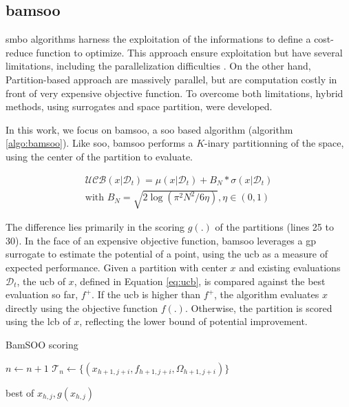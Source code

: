 \subsection{\acrfull{bamsoo}}
\label{sec:bamsoo}

\acrfull{smbo} algorithms harness the exploitation of the informations to define a cost-reduce function to optimize. This approach ensure exploitation but have several limitations, including the parallelization difficulties \cite{X,X}. On the other hand, Partition-based approach are massively parallel, but are computation costly in front of very expensive objective function. To overcome both limitations, hybrid methods, using surrogates and space partition, were developed.

In this work, we focus on \acrshort{bamsoo}, a \acrshort{soo} based algorithm (algorithm \ref{algo:bamsoo}). Like \acrshort{soo}, \acrshort{bamsoo} performs a $K$-inary partitionning of the space, using the center of the partition to evaluate. 

\begin{equation}
    \begin{split}
    \mathcal{UCB}(x| \mathcal D_t) = \mu(x|\mathcal D_t) +  B_N * \sigma(x|\mathcal D_t) 
    \\ \text{with } B_N = \sqrt{2 \log (\pi^2 N^2/6 \eta)} , \eta \in (0,1)      
    \end{split}  
    \label{eq:ucb}
\end{equation}

The difference lies primarily in the scoring $g(.)$ of the partitions (lines 25 to 30). In the face of an expensive objective function, \acrshort{bamsoo} leverages a \acrshort{gp} surrogate to estimate the potential of a point, using the \acrshort{ucb} as a measure of expected performance. Given a partition with center $x$ and existing evaluations $\mathcal{D}_t$, the \acrshort{ucb} of $x$, defined in Equation \ref{eq:ucb}, is compared against the best evaluation so far, $f^+$. If the \acrshort{ucb} is higher than $f^+$, the algorithm evaluates $x$ directly using the objective function $f(.)$. Otherwise, the partition is scored using the \acrshort{lcb} of $x$, reflecting the lower bound of potential improvement.


\begin{algorithm}[h]
    \caption{BamSOO scoring}
    \label{algo:bamsoo_scoring}    
    
                    $n \gets n+1$ \;
                    $\mathcal{T}_n \gets \{(x_{h+1,j+i}, f_{h+1,j+i}, \Omega_{h+1,j+i})\}$ \;
                
    \Return best of $x_{h,j}, g(x_{h,j})$ \;
    \end{algorithm}

